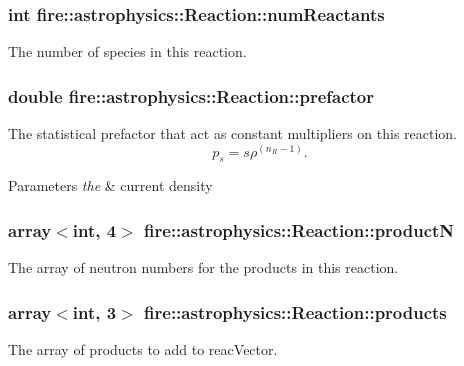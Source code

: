 \subsubsection[{\texorpdfstring{num\+Reactants}{numReactants}}]{\setlength{\rightskip}{0pt plus 5cm}int fire\+::astrophysics\+::\+Reaction\+::num\+Reactants}\hypertarget{a00022_a86154569e16ef396c93cdf97c5eaf5b7}{}\label{a00022_a86154569e16ef396c93cdf97c5eaf5b7}
The number of species in this reaction. 
\subsubsection[{\texorpdfstring{prefactor}{prefactor}}]{\setlength{\rightskip}{0pt plus 5cm}double fire\+::astrophysics\+::\+Reaction\+::prefactor}\hypertarget{a00022_a5033228e6305beb4e8dd717d2f088d99}{}\label{a00022_a5033228e6305beb4e8dd717d2f088d99}
The statistical prefactor that act as constant multipliers on this reaction. \[ p_s = s\rho^{(n_R -1)}. \] 
\begin{DoxyParams}{Parameters}
{\em the} & current density \\
\hline
\end{DoxyParams}
\subsubsection[{\texorpdfstring{productN}{productN}}]{\setlength{\rightskip}{0pt plus 5cm}array$<$int, 4$>$ fire\+::astrophysics\+::\+Reaction\+::productN}\hypertarget{a00022_a81251169f8dd972b6cdc285fbc42c331}{}\label{a00022_a81251169f8dd972b6cdc285fbc42c331}
The array of neutron numbers for the products in this reaction. 
\subsubsection[{\texorpdfstring{products}{products}}]{\setlength{\rightskip}{0pt plus 5cm}array$<$int, 3$>$ fire\+::astrophysics\+::\+Reaction\+::products}\hypertarget{a00022_a5d0e77ebec059081aaafa5ba86df4c88}{}\label{a00022_a5d0e77ebec059081aaafa5ba86df4c88}
The array of products to add to reac\+Vector.

